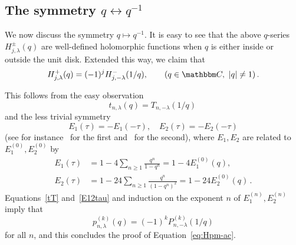 \documentclass[12pt,reqno]{amsart}
\theoremstyle{definition}
\def\BC{\mathbbm C}
\def\be{\begin{equation}}
\begin{document}
  \subsection{The symmetry $q \leftrightarrow q^{-1}$}
  \label{sub.qsym}

  We now discuss the symmetry $q \mapsto q^{-1}$. 
  It is easy to see that the above $q$-series $H_{j,\lambda}^{\pm}(q)$
  are well-defined holomorphic functions when $q$ is either inside or
  outside the unit disk. Extended this way, we claim that
  \begin{equation}
    \label{eq:Hpm-ac}
    H_{j,\lambda}^{+}(q) = (-1)^j H_{j,-\lambda}^{-}(1/q),
    \qquad (q \in \BC,\,\, |q| \neq 1) \,.
  \end{equation}

  This follows from the easy observation
  \be
  \label{tT}
    t_{n,\lambda}(q) = T_{n,-\lambda}(1/q) \,
\end{equation}
and the less trivial symmetry
\begin{equation}
\label{E12tau}
    E_1(\tau) = -E_1(-\tau),\quad E_2(\tau) = -E_2(-\tau)
\end{equation}
  (see for instance~\cite{bettin} for the first and~\cite{moller-zagier}
  for the second), where $E_1,E_2$ are related to $E_1^{(0)},E_2^{(0)}$ by
\begin{align}
E_1(\tau) &= 1 - 4\sum_{n\geq 1} \frac{q^n}{1-q^n} = 1- 4E_1^{(0)}(q), \\
E_2(\tau) &= 1 - 24\sum_{n\geq 1} \frac{q^n}{(1-q^n)^2} = 1-24E_2^{(0)}(q) \,.
\end{align}
Equations~\eqref{tT} and~\eqref{E12tau} and induction on the
exponent $n$ of $E_{1}^{(n)}, E_{2}^{(n)}$ imply that
  \begin{equation}
    p_{n,\lambda}^{(k)}(q) = (-1)^k P_{n,-\lambda}^{(k)}(1/q) 
  \end{equation}
  for all $n$, and this concludes the proof of Equation~\eqref{eq:Hpm-ac}.
 
\end{document}
